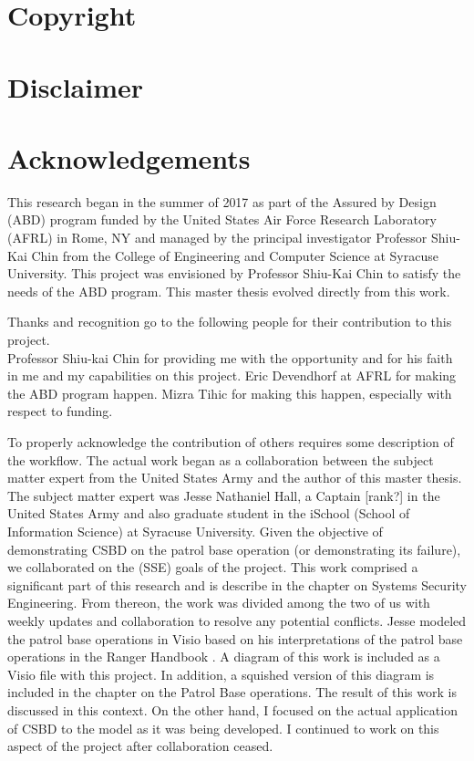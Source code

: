 \documentclass[../main/main.tex]{subfiles}
\begin{document}
\section*{Copyright}
\cleardoublepage

\section*{Disclaimer}
\cleardoublepage

\section*{Acknowledgements}
This research began in the summer of 2017 as part of the Assured by Design (ABD) program funded by the United States Air Force Research Laboratory (AFRL) in Rome, NY and managed by the principal investigator Professor Shiu-Kai Chin from the College of Engineering and Computer Science at Syracuse University.  This project was envisioned by Professor Shiu-Kai Chin to satisfy the needs of the ABD program.  This master thesis evolved directly from this work.

Thanks and recognition go to the following people for their contribution to this project.\\
Professor Shiu-kai Chin for providing me with the opportunity and for his faith in me and my capabilities on this project.  Eric Devendhorf at AFRL for making the ABD program happen. Mizra Tihic for making this happen, especially with respect to funding.

To properly acknowledge the contribution of others requires some description of the workflow.  The actual work began as a collaboration between the subject matter expert from the United States Army and the author of this master thesis.  The subject matter expert was Jesse Nathaniel Hall, a Captain [rank?] in the United States Army and also graduate student in the iSchool (School of Information Science) at Syracuse University. Given the objective of demonstrating CSBD on the patrol base operation (or demonstrating its failure), we collaborated on the  (SSE) goals of the project.  This work comprised a significant part of this research and is describe in the chapter on Systems Security Engineering.  From thereon, the work was divided among the two of us with weekly updates and collaboration to resolve any potential conflicts.   Jesse modeled the patrol base operations in Visio based on his interpretations of the patrol base operations in the Ranger Handbook \cite{rangermanual}.  A diagram of this work is included as a Visio file with this project.  In addition, a squished version of this diagram is included in the chapter on the Patrol Base operations.  The result of this work is discussed in this context.   On the other hand, I focused on the actual application of CSBD to the model as it was being developed.  I continued to work on this aspect of the project after collaboration ceased.  
\end{document}
